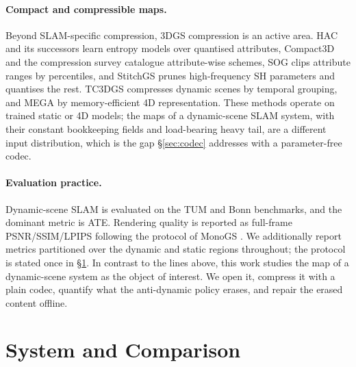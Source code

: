 \documentclass[10pt,twocolumn,letterpaper]{article}
\begin{document}
\paragraph{Compact and compressible maps.}
Beyond SLAM-specific compression, 3DGS compression is an active area. HAC \cite{HAC}
and its successors learn entropy models over quantised attributes, Compact3D
\cite{Compact3D} and the compression survey \cite{CompressionSurvey} catalogue
attribute-wise schemes, SOG \cite{SOG} clips attribute ranges by percentiles, and
StitchGS \cite{StitchGS} prunes high-frequency SH parameters and quantises the rest.
TC3DGS \cite{TC3DGS} compresses dynamic scenes by
temporal grouping, and MEGA \cite{MEGA} by memory-efficient 4D representation. These
methods operate on trained static or 4D models; the maps of a dynamic-scene SLAM
system, with their constant bookkeeping fields and load-bearing heavy tail, are a
different input distribution, which is the gap \S\ref{sec:codec} addresses with a
parameter-free codec. %

\paragraph{Evaluation practice.}
Dynamic-scene SLAM is evaluated on the TUM \cite{TUMBenchmark} and Bonn
\cite{BonnDataset} benchmarks, and the dominant metric is ATE. Rendering quality is
reported as full-frame PSNR/SSIM/LPIPS following the protocol of MonoGS
\cite{MonoGS}. We additionally report metrics partitioned over the dynamic and static
regions throughout; the protocol is stated once in \S\ref{sec:system}. In contrast to the lines above, this work studies the map of a dynamic-scene
system as the object of interest. We open it, compress it with a plain codec, quantify what the
anti-dynamic policy erases, and repair the erased content
offline.

\section{System and Comparison}
\label{sec:system}
\end{document}
